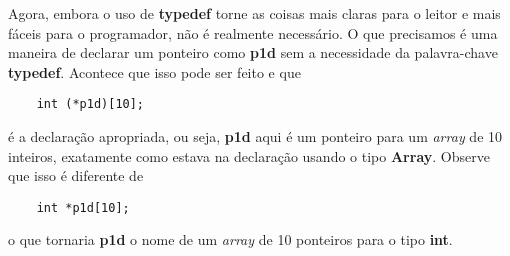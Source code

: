 Agora, embora o uso de \textbf{typedef} torne as coisas mais claras para o leitor e mais fáceis para o programador, não é realmente necessário. O que precisamos é uma maneira de declarar um ponteiro como \textbf{p1d} sem a necessidade da palavra-chave \textbf{typedef}. Acontece que isso pode ser feito e que
\begin{lstlisting}
	int (*p1d)[10];
\end{lstlisting}
é a declaração apropriada, ou seja, \textbf{p1d} aqui é um ponteiro para um \textit{array} de 10 inteiros, exatamente como estava na declaração usando o tipo \textbf{Array}. Observe que isso é diferente de
\begin{lstlisting}
	int *p1d[10];
\end{lstlisting}
o que tornaria \textbf{p1d} o nome de um \textit{array} de 10 ponteiros para o tipo \textbf{int}.
